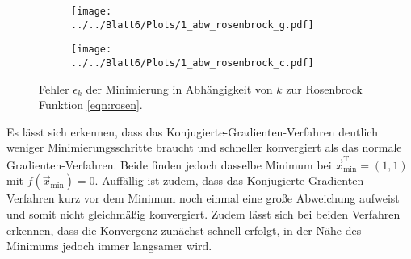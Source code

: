\begin{figure}[H]
\begin{subfigure}[c]{0.5\textwidth}
\texttt{[image: ../../Blatt6/Plots/1\_abw\_rosenbrock\_g.pdf]}
\label{fig:abw1a}
\end{subfigure}
\begin{subfigure}[c]{0.5\textwidth}
\texttt{[image: ../../Blatt6/Plots/1\_abw\_rosenbrock\_c.pdf]}
\label{fig:abw1b}
\end{subfigure}
\caption{Fehler $\epsilon_k$ der Minimierung in Abhängigkeit von $k$ zur Rosenbrock Funktion \eqref{eqn:rosen}.}
\label{fig:plot_abw_r}
\end{figure}
 Es lässt sich erkennen, dass das Konjugierte-Gradienten-Verfahren deutlich weniger Minimierungsschritte braucht und schneller konvergiert als das normale Gradienten-Verfahren. Beide finden jedoch dasselbe Minimum bei $\vec{x}_{\text{min}}^{\text{T}}=(1,1)$ mit $f(\vec{x}_{\text{min}})=0$. Auffällig ist zudem, dass das Konjugierte-Gradienten-Verfahren kurz vor dem Minimum noch einmal eine große Abweichung aufweist und somit nicht gleichmäßig konvergiert. Zudem lässt sich bei beiden Verfahren erkennen, dass die Konvergenz zunächst schnell erfolgt, in der Nähe des Minimums jedoch immer langsamer wird.


